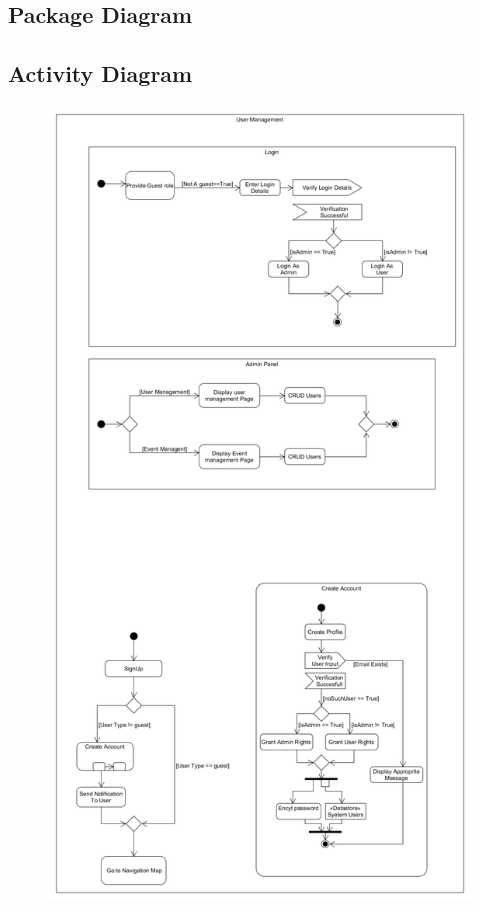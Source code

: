 \subsection{Package Diagram}

\subsection{Activity Diagram}

\begin{figure}[ht]
	\includegraphics[width=\textwidth]{User_Management/User_Management_Activity_Diagram.png}
\end{figure}

